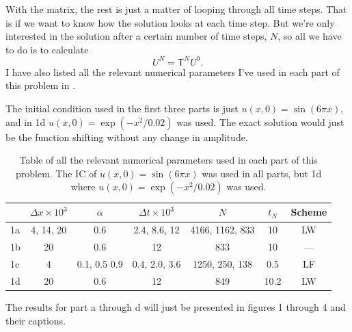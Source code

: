 \documentclass[11pt,letter, swedish, english
]{article}
\newcommand{\Dx}{\ensuremath{\Delta{x}}}
\newcommand{\Dt}{\ensuremath{\Delta{t}}}
\begin{document}
With the matrix, the rest is just a matter of looping through all time
steps. That is if we want to know how the solution looks at each time
step. But we're only interested in the solution after a certain number
of time steps, $N$, so all we have to do is to calculate
\begin{equation}
U^{N}=\mathsf{T}^NU^{0}.
\end{equation}
I have also listed all the relevant numerical parameters I've used in
each part of this problem in .

The initial condition used in the first three parts is just $u(x,
0)=\sin(6\pi x)$, and in 1d $u(x, 0)=\exp(-x^2/0.02)$ was used. The
exact solution would just be the function shifting without any change
in amplitude. 

\begin{table}\centering
\caption{Table of all the relevant numerical parameters used in each
  part of this problem. The IC of $u(x, 0)=\sin(6\pi x)$ was used in
  all parts, but 1d where $u(x, 0)=\exp(-x^2/0.02)$ was used. }
\label{tab:1_num_par}
\begin{tabular}{l|c|c|c|c|c|c|}\cline{2-7}
& $\Dx\times10^3$ & $\alpha$ 
& $\Dt\times10^3$ & $N$& $t_N$ & Scheme
\\ \hline
\multicolumn{1}{|l|}{1a} 
& 4, 14, 20 & 0.6 & 2.4, 8.6, 12 
& 4166, 1162, 833 & 10 & LW
\\ \hline
\multicolumn{1}{|l|}{1b} 
& 20 & 0.6 & 12 & 833 & 10 & ---
\\ \hline 
\multicolumn{1}{|l|}{1c} 
& 4 & 0.1, 0.5 0.9 & 0.4, 2.0, 3.6
& 1250, 250, 138 & 0.5 & LF
\\ \hline
\multicolumn{1}{|l|}{1d} 
& 20 & 0.6 & 12 
& 849 & 10.2 & LW
\\ \hline
\end{tabular}
\end{table}

The results for part a through d will just be presented in figures 1
through 4 and their captions.
\end{document}
